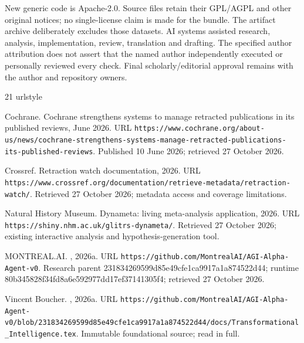 \documentclass[11pt]{article}
\begin{document}
New generic code is Apache-2.0. Source files retain their GPL/AGPL and other original notices; no single-license claim is made for the bundle. The artifact archive deliberately excludes those datasets. AI systems assisted research, analysis, implementation, review, translation and drafting. The specified author attribution does not assert that the named author independently executed or personally reviewed every check. Final scholarly/editorial approval remains with the author and repository owners.

\clearpage
\begin{thebibliography}{21}
\providecommand{\natexlab}[1]{#1}
\providecommand{\url}[1]{\texttt{#1}}
\expandafter\ifx\csname urlstyle\endcsname\relax
  \providecommand{\doi}[1]{doi: #1}\else
  \providecommand{\doi}{doi: \begingroup \urlstyle{rm}\Url}\fi

{Cochrane}.
\newblock Cochrane strengthens systems to manage retracted publications in its
  published reviews, June 2026.
\newblock URL
  \url{https://www.cochrane.org/about-us/news/cochrane-strengthens-systems-manage-retracted-publications-its-published-reviews}.
\newblock Published 10 June 2026; retrieved 27 October 2026.

{Crossref}.
\newblock Retraction watch documentation, 2026.
\newblock URL
  \url{https://www.crossref.org/documentation/retrieve-metadata/retraction-watch/}.
\newblock Retrieved 27 October 2026; metadata access and coverage limitations.

{Natural History Museum}.
\newblock Dynameta: living meta-analysis application, 2026.
\newblock URL \url{https://shiny.nhm.ac.uk/glitrs-dynameta/}.
\newblock Retrieved 27 October 2026; existing interactive analysis and
  hypothesis-generation tool.

\bibitem[{MONTREAL.AI}(2026{\natexlab{a}})]{repository}
{MONTREAL.AI}.
,
  2026{\natexlab{a}}.
\newblock URL \url{https://github.com/MontrealAI/AGI-Alpha-Agent-v0}.
\newblock Research parent 231834269599d85e49cfe1ca9917a1a874522d44; runtime
  80b345828f34fd8a6e592977dd17ef37141305f4; retrieved 27 October 2026.

\bibitem[Boucher(2026{\natexlab{a}})]{ti}
Vincent Boucher.
,
  2026{\natexlab{a}}.
\newblock URL
  \url{https://github.com/MontrealAI/AGI-Alpha-Agent-v0/blob/231834269599d85e49cfe1ca9917a1a874522d44/docs/Transformational_Intelligence.tex}.
\newblock Immutable foundational source; read in full.


\end{thebibliography}
\end{document}
